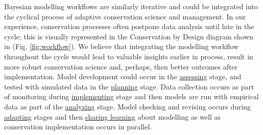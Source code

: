 \documentclass{article}
\begin{document}
\par Bayesian modelling workflows are similarly iterative and could be integrated into the cyclical process of adaptive conservation science and management. In our experience, conservation processes often postpone data analysis until late in the cycle; this is visually represented in the Conservation by Design diagram shown in (Fig. \ref{fig:workflow}). We believe that integrating the modelling workflow throughout the cycle would lead to valuable insights earlier in process, result in more robust conservation science and, perhaps, then better outcomes after implementation. Model development could occur in the \underline{assessing} stage, and tested with simulated data in the \underline{planning} stage. Data collection occurs as part of monitoring during \underline{implementing} stage and then models are run with empirical data as part of the \underline{analyzing} stage. Model checking and revising occurs during \underline{adapting} stages and then \underline{sharing learning} about modelling as well as conservation implementation occurs in parallel.  
\end{document}
